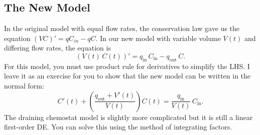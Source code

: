 \documentclass[10pt,letterpaper]{article}
\begin{document}
\subsection*{The New Model}
In the original model with equal flow rates, the conservation law gave us the equation $(VC)' = qC_{in} - qC$. In our new model with variable volume $V(t)$ and differing flow rates, the equation is 
$$
(V(t)\, C(t))' = q_{\text{in}} \,C_{\text{in}} - q_{\text{out}} \,C.
$$
For this model, you must use product rule for derivatives to simplify the LHS. I leave it as an exercise for you to show that the new model can be written in the normal form:
\[
C'(t)
+
\left(
 \frac{q_{\text{out}}+V'(t)}{V(t)}
\right) C(t)
=
\frac{q_{\text{in}}}{V(t)}\,C_{\text{in}}.
\]
The draining chemostat model is slightly more complicated but it is still a linear first-order DE. You can solve this using the method of integrating factors.
\end{document}
